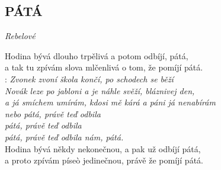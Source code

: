 \begin{flushleft}
	\section*{\Huge PÁTÁ}
	\emph{Rebelové}
\end{flushleft}

Hodina bývá dlouho trpělivá a potom odbíjí,\hspace{1cm} pátá,\\
a tak tu zpívám slova mlčenlivá o tom, že pomíjí pátá.\\

\textregistered: \emph{Zvonek zvoní škola končí, po schodech se běží\\
Novák leze po jabloni a je náhle svěží, bláznivej den,\\
a já smíchem umírám, kdosi mě kárá a páni já nenabírám\\
nebo pátá,\hspace{0,5cm} právě teď odbila\\
pátá,\hspace{0,5cm} právě teď odbila\\
pátá,\hspace{0,5cm} právě teď odbila nám, pátá.}\\

Hodina bývá někdy nekonečnou, a pak už odbíjí pátá,\\
a proto zpívám píseò jedinečnou, právě že pomíjí pátá.\\

\textregistered

\newpage
